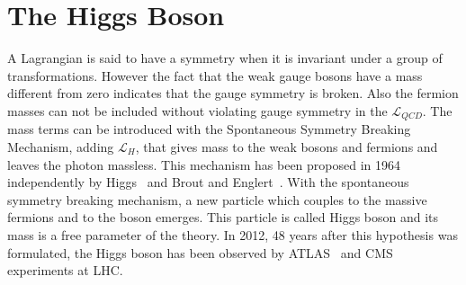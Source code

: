 \section{The Higgs Boson}
\label{H}
A  Lagrangian is said to have a symmetry when it is invariant under a group of transformations. 
However the fact that the weak gauge bosons have a mass different from zero indicates that
the gauge symmetry is broken. Also the fermion masses can
not be included without violating gauge symmetry in the $\mathcal{L}_{QCD}$.
The mass terms can be introduced with the Spontaneous Symmetry Breaking Mechanism, adding  $\mathcal{L}_{H}$, that gives mass to the weak bosons and fermions and leaves the photon massless. This mechanism has been proposed in 1964 independently by Higgs~\cite{HIGGS1964132} and Brout and Englert~\cite{PhysRevLett.13.321}. With the spontaneous symmetry breaking mechanism, a  new particle which couples  to the massive fermions and to the boson emerges. This particle is called Higgs boson and its mass is a free parameter of the theory. In 2012, 48 years after this hypothesis was formulated, the Higgs boson has been observed by ATLAS~\cite{Aad:2012tfa} and CMS~\cite{Chatrchyan:2012xdj} experiments at LHC.


